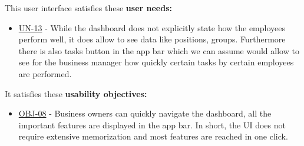 \documentclass[]{VUMIFTemplateClass}
\begin{document}
This user interface satisfies these \textbf{user needs:}

\begin{itemize}
    \item \hyperref[UN-13]{UN-13} - While the dashboard does not explicitly state how the employees perform well, it does allow to see data like positions, groups. Furthermore there is also tasks button in the app bar which we can assume would allow to see for the business manager how quickly certain tasks by certain employees are performed.
\end{itemize}

It satisfies these \textbf{usability objectives:}

\begin{itemize}
    \item \hyperref[OBJ-08]{OBJ-08} - Business owners can quickly navigate the dashboard, all the important features are displayed in the app bar. In short, the UI does not require extensive memorization and most features are reached in one click.
\end{itemize}
















\end{document}
